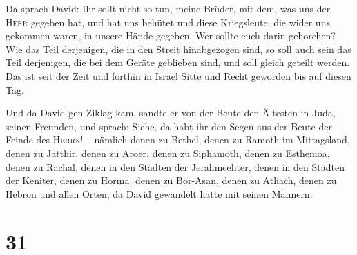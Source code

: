  Da sprach David: Ihr sollt nicht so tun, meine Brüder,
mit dem, was uns der \textsc{Herr} gegeben hat, und hat uns behütet und
diese Kriegsleute, die wider uns gekommen waren, in unsere Hände
gegeben.  Wer sollte euch darin gehorchen? Wie das Teil
derjenigen, die in den Streit hinabgezogen sind, so soll auch sein das
Teil derjenigen, die bei dem Geräte geblieben sind, und soll gleich
geteilt werden.  Das ist seit der Zeit und forthin in
Israel Sitte und Recht geworden bis auf diesen Tag.

 Und da David gen Ziklag kam, sandte er von der Beute den
Ältesten in Juda, seinen Freunden, und sprach: Siehe, da habt ihr den
Segen aus der Beute der Feinde des \textsc{Herrn}! -- 
nämlich denen zu Bethel, denen zu Ramoth im Mittagsland, denen zu
Jatthir,  denen zu Aroer, denen zu Siphamoth, denen zu
Esthemoa,  denen zu Rachal, denen in den Städten der
Jerahmeeliter, denen in den Städten der Keniter,  denen
zu Horma, denen zu Bor-Asan, denen zu Athach,  denen zu
Hebron und allen Orten, da David gewandelt hatte mit seinen Männern.

\hypertarget{section-30}{%
\section{31}\label{section-30}}


